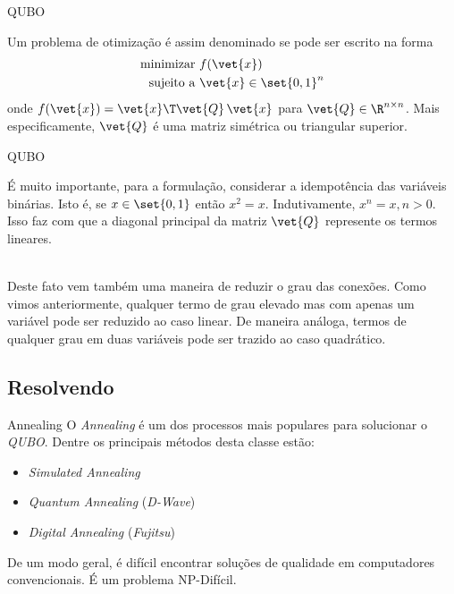 \documentclass[brazil, MathSerif, aspectratio = 169]{beamer}
\begin{document}
\begin{frame}{QUBO}
    \begin{definition}
        Um problema de otimização é assim denominado se pode ser escrito na forma 
        \begin{align*}
            \text{minimizar } &f(\vet{x})\\
            \text{sujeito a } &\vet{x} \in \set{0, 1}^{n}
        \end{align*}
        onde $f(\vet{x}) = \vet{x}\T \vet{Q}\, \vet{x}$ para $\vet{Q} \in \R^{n \times n}$. Mais especificamente, $\vet{Q}$ é uma matriz simétrica ou triangular superior.
    \end{definition}    
\end{frame}

\begin{frame}{QUBO}
    \begin{observation}
        É muito importante, para a formulação, considerar a idempotência das variáveis binárias. Isto é, se $x \in \set{0, 1}$ então $x^2 = x$. Indutivamente, $x^n = x, n > 0$. Isso faz com que a diagonal principal da matriz $\vet{Q}$ represente os termos lineares.\par
        ~\\
        Deste fato vem também uma maneira de reduzir o grau das conexões. Como vimos anteriormente, qualquer termo de grau elevado mas com apenas um variável pode ser reduzido ao caso linear. De maneira análoga, termos de qualquer grau em duas variáveis pode ser trazido ao caso quadrático.\par
    \end{observation}
\end{frame}

\subsection{Resolvendo}

\begin{frame}{Annealing}
    O \emph{Annealing} é um dos processos mais populares para solucionar o \emph{QUBO}. Dentre os principais métodos desta classe estão:
    \begin{itemize}%
        \item \emph{Simulated Annealing}
        \item \emph{Quantum Annealing} (\emph{D-Wave})
        \item \emph{Digital Annealing} (\emph{Fujitsu})
    \end{itemize}
    \pause
    De um modo geral, é difícil encontrar soluções de qualidade em computadores convencionais. É um problema NP-Difícil.
\end{frame}
\end{document}
